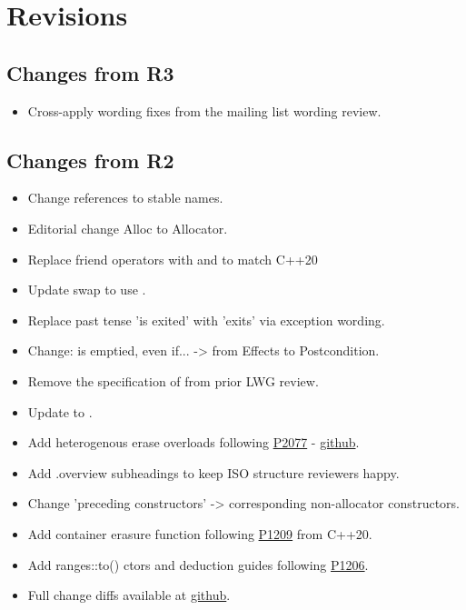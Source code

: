 \section{Revisions}

\subsection{Changes from R3}

\begin{itemize}
  \item Cross-apply wording fixes from the  mailing list wording review.
\end{itemize}

\subsection{Changes from R2}

\begin{itemize}
  \item Change references to stable names.
  \item Editorial change Alloc to Allocator.
  \item Replace friend operators with  and  to match C++20
  \item Update swap to use .
  \item Replace past tense 'is exited' with 'exits' via exception wording.
  \item {} Change:  is emptied, even if...  -> from Effects to Postcondition.
  \item Remove the specification of  from prior LWG review.
  \item Update  to .
  \item Add heterogenous erase overloads following \href{https://wg21.link/P2077}{P2077} - \href{https://github.com/tzlaine/flat_map/commit/a241df6b978479f0cc135ec567dbea4cd7407dd6}{github}.
  \item Add .overview subheadings to keep ISO structure reviewers happy.
  \item Change 'preceding constructors' -> corresponding non-allocator constructors.
  \item Add container erasure  function following \href{https://wg21.link/P1209}{P1209} from C++20.
  \item Add ranges::to() ctors and deduction guides following \href{https://wg21.link/P1206}{P1206}.
  \item Full change diffs available at \href{https://github.com/tzlaine/flat_map/commits/flat_set}{github}.
\end{itemize}

